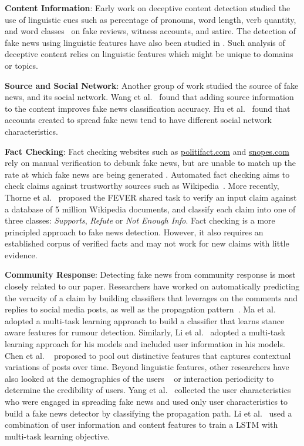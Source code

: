 \documentclass[letterpaper]{article} %
\begin{document}
\textbf{Content Information}: Early work on deceptive content detection studied the use of linguistic cues such as percentage of pronouns, word length, verb quantity, and word classes~\cite{fuller09,mihalcea09,ott11,rubin16} on fake reviews, witness accounts, and satire. The detection of fake news using linguistic features have also been studied in \cite{obrien18,wang17liar}. Such analysis of deceptive content relies on linguistic features which might be unique to domains or topics. 

\textbf{Source and Social Network}:
Another group of work studied the source of fake news, and its social network. Wang et al.~ found that adding source information to the content improves fake news classification accuracy. Hu et al.~ found that accounts created to spread fake news tend to have different social network characteristics.

\textbf{Fact Checking}:
Fact checking websites such as \url{politifact.com} and \url{snopes.com} rely on manual verification to debunk fake news, but are unable to match up the rate at which fake news are being generated \cite{poynter_2019}. Automated fact checking aims to check claims against trustworthy sources such as Wikipedia~\cite{giovanni15}.  More recently, Thorne et al.~ proposed the FEVER shared task to verify an input claim against a database of 5 million Wikipedia documents, and classify each claim into one of three classes: \textit{Supports}, \textit{Refute} or \textit{Not Enough Info}. Fact checking is a more principled approach to fake news detection. However, it also requires an established corpus of verified facts and may not work for new claims with little evidence. 

\textbf{Community Response}:
Detecting fake news from community response is most closely related to our paper. Researchers have worked on automatically predicting the veracity of a claim by building classifiers that leverages on the comments and replies to social media posts, as well as the propagation pattern~\cite{omar17,castillo11,ma17,ma18}. Ma et al.~ adopted a multi-task learning approach to build a classifier that learns stance aware features for rumour detection. Similarly, Li et al.~ adopted a multi-task learning approach for his models and included user information in his models. Chen et al. ~ proposed to pool out distinctive features that captures contextual variations of posts over time. Beyond linguistic features, other researchers have also looked at the demographics of the users ~\cite{yang12,li-etal-2019-rumor} or interaction periodicity \cite{kwon13a} to determine the credibility of users. Yang et al.~ collected the user characteristics who were engaged in spreading fake news and used only user characteristics to build a fake news detector by classifying the propagation path. Li et al.~ used a combination of user information and content features to train a LSTM with multi-task learning objective.
\end{document}
